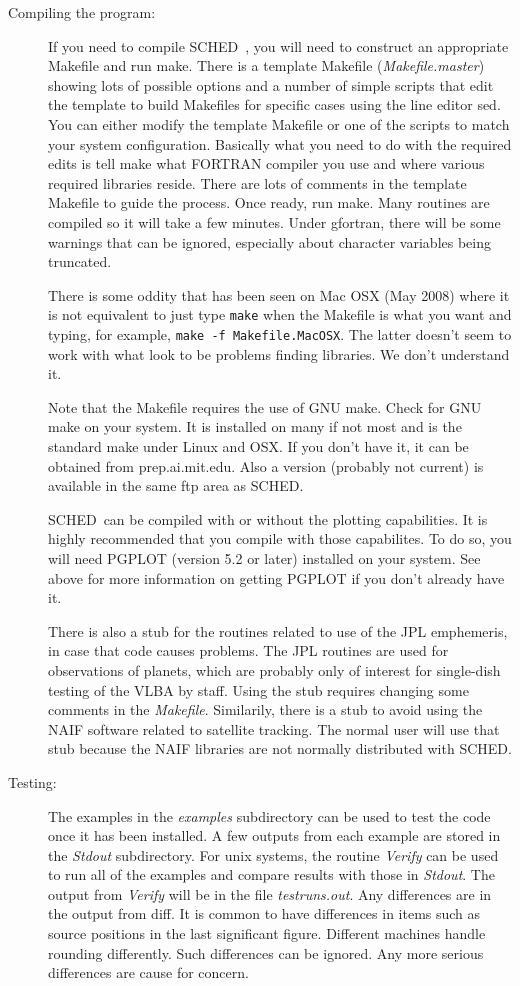 \documentclass{report}
\newcommand{\sched}{{\sc SCHED}}
\newcommand{\schedb}{{\sc SCHED~}}
\begin{document}
\begin{description}
\item [Compiling the program:] If you need to compile \schedb, you
will need to construct an appropriate Makefile and run make.  There is
a template Makefile ({\sl Makefile.master}) showing lots of possible
options and a number of simple scripts that edit the template to build
Makefiles for specific cases using the line editor sed.  You can
either modify the template Makefile or one of the scripts to match
your system configuration.  Basically what you need to do with the
required edits is tell make what FORTRAN compiler you use and where
various required libraries reside.  There are lots of comments in the
template Makefile to guide the process.  Once ready, run make.  Many
routines are compiled so it will take a few minutes.  Under gfortran,
there will be some warnings that can be ignored, especially about
character variables being truncated.

There is some oddity that has been seen on Mac OSX (May 2008) where it
is not equivalent to just type {\tt make} when the Makefile is what
you want and typing, for example, {\tt make -f Makefile.MacOSX}.  The
latter doesn't seem to work with what look to be problems finding
libraries.  We don't understand it.

Note that the Makefile requires the use of GNU make.  Check for GNU
make on your system.  It is installed on many if not most and is the
standard make under Linux and OSX.  If you don't have it, it can be
obtained from prep.ai.mit.edu.  Also a version (probably not current)
is available in the same ftp area as \sched.

\schedb can be compiled with or without the plotting capabilities.  It
is highly recommended that you compile with those capabilites.  To do
so, you will need {\sc PGPLOT} (version 5.2 or later) installed on
your system.  See above for more information on getting {\sc PGPLOT}
if you don't already have it.

There is also a stub for the routines related to use of the JPL
emphemeris, in case that code causes problems.  The JPL routines are
used for observations of planets, which are probably only of interest
for single-dish testing of the VLBA by staff.  Using the stub requires
changing some comments in the {\sl Makefile}.  Similarily, there is
a stub to avoid using the NAIF software related to satellite tracking.
The normal user will use that stub because the NAIF libraries are not
normally distributed with \sched.

\item [Testing:] The examples in the {\sl examples} subdirectory can
be used to test the code once it has been installed.  A few outputs
from each example are stored in the {\sl Stdout} subdirectory.  For
unix systems, the routine {\sl Verify} can be used to run all of the
examples and compare results with those in {\sl Stdout}.  The output
from {\sl Verify} will be in the file {\sl testruns.out}.  Any
differences are in the output from diff.  It is common to have
differences in items such as source positions in the last significant
figure.  Different machines handle rounding differently.  Such
differences can be ignored.  Any more serious differences are cause
for concern.


\end{description}
\end{document}
